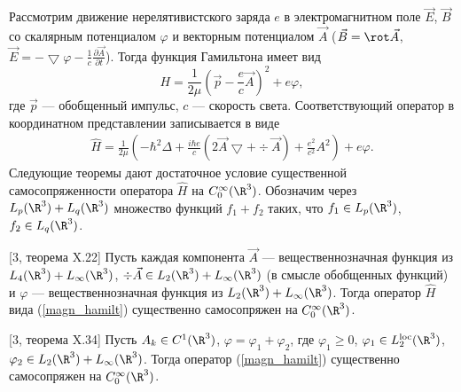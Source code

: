 \documentclass[a4paper
]{article}
\begin{document}
Рассмотрим движение нерелятивистского заряда $e$ в электромагнитном поле
$\vec E$, $\vec B$ со скалярным потенциалом $\varphi$ и векторным
потенциалом $\vec A$ ($\vec B=\rot \vec A$, $\vec E=-\bigtriangledown
\varphi-\frac{1}{c}\frac{\partial \vec A}{\partial t}$). Тогда
функция Гамильтона имеет вид
$$H=\frac{1}{2\mu}\left(\vec p-\frac{e}{c}\vec A\right)^2+e\varphi,$$
где $\vec p$ --- обобщенный импульс, $c$ --- скорость света. Соответствующий
оператор в координатном представлении записывается в виде
\begin{align}
\label{magn_hamilt}
\hat H=\frac{1}{2\mu}\left(-\hbar^2\Delta+\frac{i\hbar e}{c}(2\vec A
\bigtriangledown+\div \vec A)+\frac{e^2}{c^2}A^2\right)+e\varphi.
\end{align}
Следующие теоремы дают достаточное условие существенной самосопряженности
оператора $\hat H$ на $C_0^\infty(\R^3)$. Обозначим через $L_p(\R^3)+
L_q(\R^3)$ множество функций $f_1+f_2$ таких, что $f_1\in L_p(\R^3)$,
$f_2\in L_q(\R^3)$.
\begin{Trm} {\rm [3, теорема X.22]}
Пусть каждая компонента $\vec A$ --- вещественнозначная функция из
$L_4(\R^3)+L_\infty(\R^3)$, $\div \vec A\in L_2(\R^3)+L_\infty(\R^3)$ (в
смысле обобщенных функций) и $\varphi$ --- вещественнозначная функция из
$L_2(\R^3)+L_\infty(\R^3)$. Тогда оператор $\hat H$ вида (\ref{magn_hamilt})
существенно самосопряжен на $C_0^\infty(\R^3)$.
\end{Trm}
\begin{Trm}
\label{magn_samosopr}
{\rm [3, теорема X.34]}
Пусть $A_k\in C^1(\R^3)$, $\varphi=\varphi_1+\varphi_2$, где $\varphi_1
\ge 0$, $\varphi_1\in L_2^{{\rm loc}}(\R^3)$, $\varphi_2\in L_2(\R^3)+L_\infty
(\R^3)$. Тогда оператор (\ref{magn_hamilt}) существенно самосопряжен на
$C_0^\infty(\R^3)$.
\end{Trm}
\end{document}
